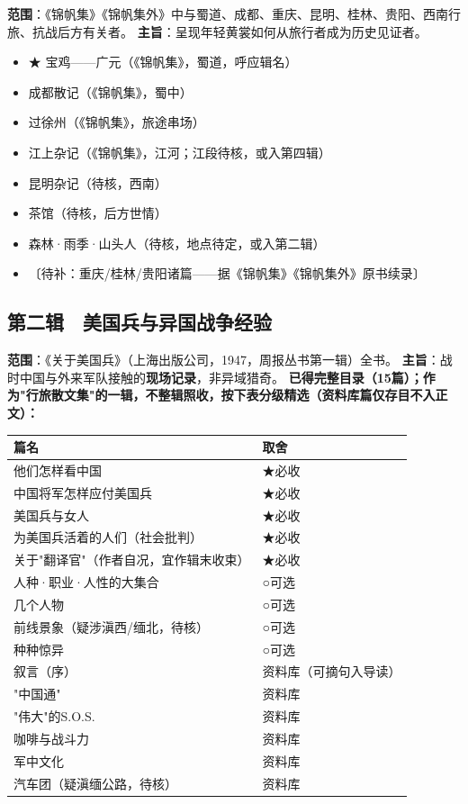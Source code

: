 \documentclass[UTF8,fontset=none,zihao=-4,a4paper]{ctexart}
\begin{document}
\textbf{范围}：《锦帆集》《锦帆集外》中与蜀道、成都、重庆、昆明、桂林、贵阳、西南行旅、抗战后方有关者。 \textbf{主旨}：呈现年轻黄裳如何从旅行者成为历史见证者。


\begin{itemize}
\item ★ 宝鸡——广元（《锦帆集》，蜀道，呼应辑名）
\item 成都散记（《锦帆集》，蜀中）
\item 过徐州（《锦帆集》，旅途串场）
\item 江上杂记（《锦帆集》，江河；江段待核，或入第四辑）
\item 昆明杂记（待核，西南）
\item 茶馆（待核，后方世情）
\item 森林·雨季·山头人（待核，地点待定，或入第二辑）
\item 〔待补：重庆/桂林/贵阳诸篇——据《锦帆集》《锦帆集外》原书续录〕
\end{itemize}


\subsection{第二辑　美国兵与异国战争经验}

\textbf{范围}：《关于美国兵》（上海出版公司，1947，周报丛书第一辑）全书。 \textbf{主旨}：战时中国与外来军队接触的\textbf{现场记录}，非异域猎奇。 \textbf{已得完整目录（15篇）；作为"行旅散文集"的一辑，不整辑照收，按下表分级精选（资料库篇仅存目不入正文）：}


\begin{center}
\footnotesize
\begin{tabularx}{\linewidth}{@{}XX@{}}
\toprule
\textbf{篇名} & \textbf{取舍} \\
\midrule
他们怎样看中国 & ★必收 \\
中国将军怎样应付美国兵 & ★必收 \\
美国兵与女人 & ★必收 \\
为美国兵活着的人们（社会批判） & ★必收 \\
关于"翻译官"（作者自况，宜作辑末收束） & ★必收 \\
人种·职业·人性的大集合 & ○可选 \\
几个人物 & ○可选 \\
前线景象（疑涉滇西/缅北，待核） & ○可选 \\
种种惊异 & ○可选 \\
叙言（序） & 资料库（可摘句入导读） \\
"中国通" & 资料库 \\
"伟大"的S.O.S. & 资料库 \\
咖啡与战斗力 & 资料库 \\
军中文化 & 资料库 \\
汽车团（疑滇缅公路，待核） & 资料库 \\
\bottomrule
\end{tabularx}
\end{center}
\end{document}
